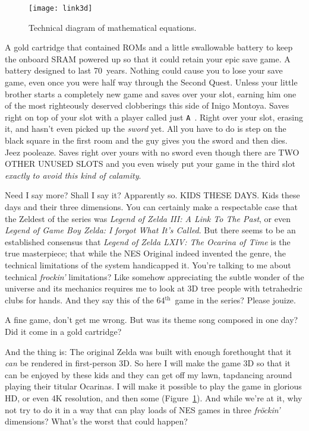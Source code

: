 \documentclass[twocolumn]{article}
\renewcommand\th{$^{\mathrm{th}}$}
\begin{document}
\begin{figure}[ht]
\begin{center}
\texttt{[image: link3d]}
\end{center}\vspace{-0.1in}
\caption{Technical diagram of mathematical equations.} \label{fig:link3d}
\end{figure}

A gold cartridge that contained ROMs and a little swallowable battery
to keep the onboard SRAM powered up so that it could retain your epic
save game. A battery designed to last 70~years. Nothing could cause
you to lose your save game, even once you were half way through the
Second Quest. Unless your little brother starts a completely new game
and saves over your slot, earning him one of the most righteously
deserved clobberings this side of Inigo Montoya. Saves right on top of
your slot with a player called just \verb+A +. Right over your slot,
erasing it, and hasn't even picked up the {\it sword} yet. All you
have to do is step on the black square in the first room and the guy
gives you the sword and then dies. Jeez pooleaze. Saves right over
yours with no sword even though there are TWO OTHER UNUSED SLOTS and
you even wisely put your game in the third slot {\it exactly to avoid
  this kind of calamity}.

\medskip
Need I say more? Shall I say it? Apparently so. KIDS THESE DAYS. Kids
these days and their three dimensions. You can certainly make a
respectable case that the Zeldest of the series was {\it Legend of
  Zelda III: A Link To The Past}, or even {\it Legend of Game Boy
  Zelda: I forgot What It's Called}. But there seems to be an
established consensus that {\it Legend of Zelda LXIV: The Ocarina of
  Time} is the true masterpiece; that while the NES Original indeed
invented the genre, the technical limitations of the system
handicapped it. You're talking to me about technical {\it frockin'}
limitations? Like somehow appreciating the subtle wonder of the
universe and its mechanics requires me to look at 3D tree people with
tetrahedric clubs for hands. And they say this of the 64\th\ game in
the series? Please jouize.

A fine game, don't get me wrong. But was its theme song composed in
one day? Did it come in a gold cartridge?

And the thing is: The original Zelda was built with enough forethought
that it {\em can} be rendered in first-person 3D. So here I will make
the game 3D so that it can be enjoyed by these kids and they can get
off my lawn, tapdancing around playing their titular Ocarinas. I will
make it possible to play the game in glorious HD, or even 4K
resolution, and then some (Figure~\ref{fig:link3d}). And while
we're at it, why not try to do it in a way that can play loads of NES
games in three {\it fr\"ockin'} dimensions? What's the worst that
could happen?
\end{document}
